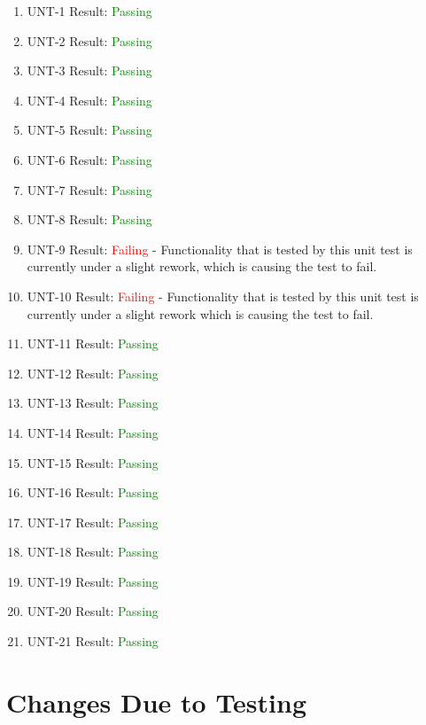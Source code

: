 \documentclass[12pt, titlepage]{article}
\begin{document}
\begin{enumerate}
  \item UNT-1
  Result: \textcolor{green}{Passing} 
  \item UNT-2
  Result: \textcolor{green}{Passing}
  \item UNT-3
  Result: \textcolor{green}{Passing}
  \item UNT-4
  Result: \textcolor{green}{Passing} 
  \item UNT-5
  Result: \textcolor{green}{Passing}
  \item UNT-6
  Result: \textcolor{green}{Passing} 
  \item UNT-7
  Result: \textcolor{green}{Passing}
  \item UNT-8
  Result: \textcolor{green}{Passing}
  \item UNT-9
  Result: \textcolor{red}{Failing} - Functionality that is tested by this unit test is currently under a slight rework, which is causing the test to fail.
  \item UNT-10
  Result: \textcolor{red}{Failing} - Functionality that is tested by this unit test is currently under a slight rework which is causing the test to fail.
  \item UNT-11
  Result: \textcolor{green}{Passing}
  \item UNT-12
  Result: \textcolor{green}{Passing} 
  \item UNT-13
  Result: \textcolor{green}{Passing}
  \item UNT-14
  Result: \textcolor{green}{Passing}
  \item UNT-15
  Result: \textcolor{green}{Passing} 
  \item UNT-16
  Result: \textcolor{green}{Passing}
  \item UNT-17
  Result: \textcolor{green}{Passing}
  \item UNT-18
  Result: \textcolor{green}{Passing} 
  \item UNT-19
  Result: \textcolor{green}{Passing}
  \item UNT-20
  Result: \textcolor{green}{Passing}
  \item UNT-21
  Result: \textcolor{green}{Passing}
\end{enumerate}

\section{Changes Due to Testing}

\end{document}
